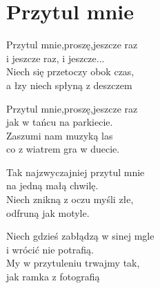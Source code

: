 \section{Przytul mnie}
\begin{text}
    Przytul mnie,proszę,jeszcze raz\\
    i jeszcze raz, i jeszcze...\\
    Niech się przetoczy obok czas,\\
    a łzy niech spłyną z deszczem

    Przytul mnie,proszę,jeszcze raz\\
    jak w tańcu na parkiecie.\\
    Zaszumi nam muzyką las\\
    co z wiatrem gra w duecie.

    Tak najzwyczajniej przytul mnie\\
    na jedną małą chwilę.\\
    Niech znikną z oczu myśli złe,\\
    odfruną jak motyle.

    Niech gdzieś zabłądzą w sinej mgle\\
    i wrócić nie potrafią.\\
    My w przytuleniu trwajmy tak,\\
    jak ramka z fotografią
\end{text}